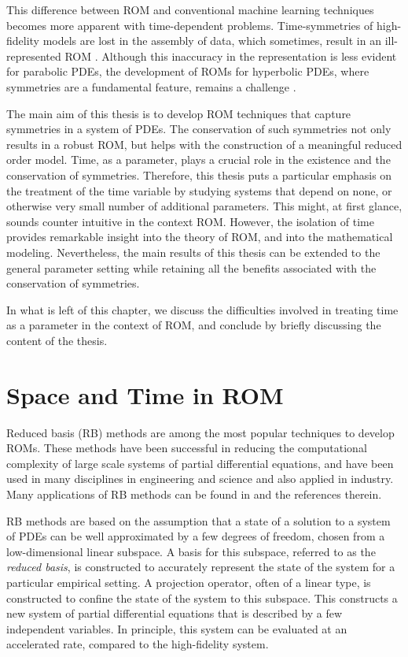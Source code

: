 This difference between ROM and conventional machine learning techniques becomes more apparent with time-dependent problems. Time-symmetries of high-fidelity models are lost in the assembly of data, which sometimes, result in an ill-represented ROM \cite{doi:10.1137/1.9780898718713}. Although this inaccuracy in the representation is less evident for parabolic PDEs, the development of ROMs for hyperbolic PDEs, where symmetries are a fundamental feature, remains a challenge \cite{doi:10.1137/17M1111991,kalashnikova2014stabilization,farhat2015structure,doi:10.1137/110836742,doi:10.1137/140959602,beattie2011structure,doi:10.1137/140978922}.

The main aim of this thesis is to develop ROM techniques that capture symmetries in a system of PDEs. The conservation of such symmetries not only results in a robust ROM, but helps with the construction of a meaningful reduced order model. Time, as a parameter, plays a crucial role in the existence and the conservation of symmetries. Therefore, this thesis puts a particular emphasis on the treatment of the time variable by studying systems that depend on none, or otherwise very small number of additional parameters. This might, at first glance, sounds counter intuitive in the context ROM. However, the isolation of time provides remarkable insight into the theory of ROM, and into the mathematical modeling. Nevertheless, the main results of this thesis can be extended to the general parameter setting while retaining all the benefits associated with the conservation of symmetries.

In what is left of this chapter, we discuss the difficulties involved in treating time as a parameter in the context of ROM, and conclude by briefly discussing the content of the thesis.

\section{Space and Time in ROM}
Reduced basis (RB) methods are among the most popular techniques to develop ROMs. These methods have been successful in reducing the computational complexity of large scale systems of partial differential equations, and have been used in many disciplines in engineering and science and also applied in industry. Many applications of RB methods can be found in \cite{hesthaven2015certified,quarteroni2015reduced,doi:10.1137/1.9781611974829,doi:10.1137/1.9780898718713} and the references therein.

RB methods are based on the assumption that a state of a solution to a system of PDEs can be well approximated by a few degrees of freedom, chosen from a low-dimensional linear subspace. A basis for this subspace, referred to as the \emph{reduced basis}, is constructed to accurately represent the state of the system for a particular empirical setting. A projection operator, often of a linear type, is constructed to confine the state of the system to this subspace. This constructs a new system of partial differential equations that is described by a few independent variables. In principle, this system can be evaluated at an accelerated rate, compared to the high-fidelity system.


